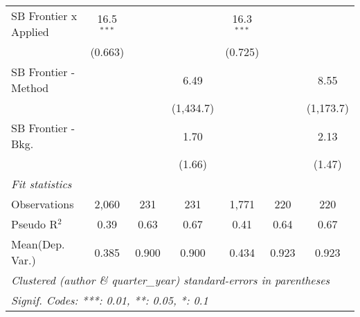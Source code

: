\begin{tabular}{lcccccc}
   SB Frontier x Applied        & 16.5$^{***}$  &            &               & 16.3$^{***}$  &             &   \\   
                                & (0.663)       &            &               & (0.725)       &             &   \\   
   SB Frontier - Method         &               &            & 6.49          &               &             & 8.55\\   
                                &               &            & (1,434.7)     &               &             & (1,173.7)\\   
   SB Frontier - Bkg.           &               &            & 1.70          &               &             & 2.13\\   
                                &               &            & (1.66)        &               &             & (1.47)\\   
   \midrule
   \emph{Fit statistics}\\
   Observations                 & 2,060         & 231        & 231           & 1,771         & 220         & 220\\  
   Pseudo R$^2$                 & 0.39          & 0.63       & 0.67          & 0.41          & 0.64        & 0.67\\  
Mean(Dep. Var.) & 0.385 & 0.900 & 0.900 & 0.434 & 0.923 & 0.923 \\
   \midrule \midrule
   \multicolumn{7}{l}{\emph{Clustered (author \& quarter\_year) standard-errors in parentheses}}\\
   \multicolumn{7}{l}{\emph{Signif. Codes: ***: 0.01, **: 0.05, *: 0.1}}\\
\end{tabular}
\par\endgroup
